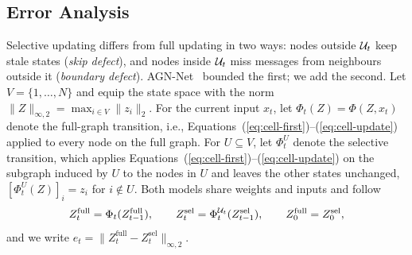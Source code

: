 \subsection{Error Analysis}
\label{sec:theory}
Selective updating differs from full updating in two ways: nodes outside $\mathcal{U}_t$ keep stale states (\emph{skip defect}), and nodes inside $\mathcal{U}_t$ miss messages from neighbours outside it (\emph{boundary defect}). AGN-Net~\cite{islam2026agnnet} bounded the first; we add the second. Let $V=\{1,\dots,N\}$ and equip the state space with the norm $\|Z\|_{\infty,2}=\max_{i\in V}\|z_i\|_2$. For the current input $x_t$, let $\Phi_t(Z)=\Phi(Z,x_t)$ denote the full-graph transition, i.e., Equations~(\ref{eq:cell-first})--(\ref{eq:cell-update}) applied to every node on the full graph. For $U\subseteq V$, let $\Phi_t^{U}$ denote the selective transition, which applies Equations~(\ref{eq:cell-first})--(\ref{eq:cell-update}) on the subgraph induced by $U$ to the nodes in $U$ and leaves the other states unchanged, $[\Phi_t^{U}(Z)]_i=z_i$ for $i\notin U$. Both models share weights and inputs and follow
\[
Z^{\mathrm{full}}_t=\Phi_t(Z^{\mathrm{full}}_{t-1}),\qquad Z^{\mathrm{sel}}_t=\Phi_t^{\mathcal{U}_t}(Z^{\mathrm{sel}}_{t-1}),\qquad Z^{\mathrm{full}}_0=Z^{\mathrm{sel}}_0,
\]
and we write $e_t=\|Z^{\mathrm{full}}_t-Z^{\mathrm{sel}}_t\|_{\infty,2}$.

